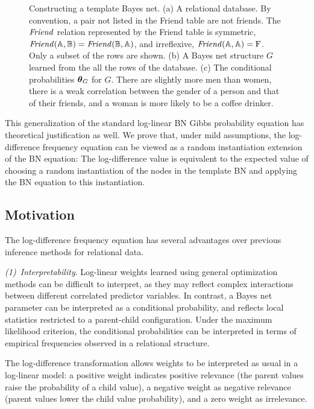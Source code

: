 \documentclass[twoside,11pt]{article}
\newcommand{\point}[1]{\noindent\emph{#1}.}
\begin{document}
\begin{figure}[htbp]
\begin{center}
\caption{Constructing a template Bayes net. (a) A relational database. By convention, a pair not listed in the Friend table are not friends. The $\it{Friend}$ relation represented by the Friend table is symmetric, $\it{Friend}(\mathbb{A},\mathbb{B}) = \it{Friend}(\mathbb{B},\mathbb{A})$, and irreflexive,
$\it{Friend}(\mathbb{A}, \mathbb{A}) = \mathrm{F}$.
Only a subset of the rows are shown. 
(b) A Bayes net structure $G$ learned from the all the rows of the database.
(c) The conditional probabilities $\boldsymbol{\theta}_G$ for $G$. There are slightly more men than women, there is a weak correlation between the gender of a person and that of their friends, and a woman is more likely to be a coffee drinker. 
}
\label{fig:pbn}
\end{center}
\end{figure}


This generalization of the standard log-linear BN Gibbs probability equation has theoretical justification as well. We prove that, under mild assumptions, the log-difference frequency equation can be viewed as a random instantiation extension of the BN equation: The log-difference value is equivalent to the expected value of choosing a random instantiation of the nodes in the template BN and applying the BN equation to this instantiation.

\subsection{Motivation}

The log-difference frequency equation has several advantages over previous inference methods for relational data.

\point{(1)~Interpretability} Log-linear weights learned using general optimization methods can be difficult to interpret, as they may reflect complex interactions between different correlated predictor variables. In contrast, a Bayes net parameter can be interpreted as a conditional probability, and reflects local statistics restricted to a parent-child configuration. Under the maximum likelihood criterion, the conditional probabilities can be interpreted in terms of empirical frequencies observed in a relational structure.

The log-difference transformation allows weights to be interpreted as usual in a log-linear model: a positive weight indicates positive relevance (the parent values raise the probability of a child value), a negative weight as negative relevance (parent values lower the child value probability), and a zero weight as irrelevance. 
\end{document}
